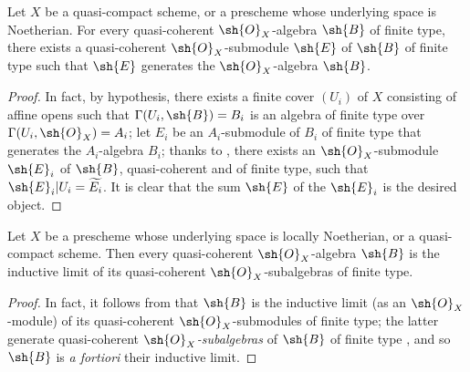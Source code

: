 \begin{proposition}[9.6.5]
\label{I.9.6.5}
Let $X$ be a quasi-compact scheme, or a prescheme whose underlying space is Noetherian.
For every quasi-coherent $\sh{O}_X$-algebra $\sh{B}$ of finite type, there exists a quasi-coherent $\sh{O}_X$-submodule $\sh{E}$ of $\sh{B}$ of finite type such that $\sh{E}$ generates  the $\sh{O}_X$-algebra $\sh{B}$.
\end{proposition}

\begin{proof}
In fact, by hypothesis, there exists a finite cover $(U_i)$ of $X$ consisting of affine opens such that $\Gamma(U_i,\sh{B})=B_i$ is an algebra of finite type over $\Gamma(U_i,\sh{O}_X)=A_i$; let $E_i$ be an $A_i$-submodule of $B_i$ of finite type that generates the $A_i$-algebra $B_i$; thanks to , there exists an $\sh{O}_X$-submodule $\sh{E}_i$ of $\sh{B}$, quasi-coherent and of finite type, such that $\sh{E}_i|U_i=\widetilde{E_i}$.
It is clear that the sum $\sh{E}$ of the $\sh{E}_i$ is the desired object.
\end{proof}

\begin{proposition}[9.6.6]
\label{I.9.6.6}
Let $X$ be a prescheme whose underlying space is locally Noetherian, or a quasi-compact scheme.
Then every quasi-coherent $\sh{O}_X$-algebra $\sh{B}$ is the inductive limit of its quasi-coherent $\sh{O}_X$-subalgebras of finite type.
\end{proposition}

\begin{proof}
In fact, it follows from  that $\sh{B}$ is the inductive limit (as an $\sh{O}_X$-module) of its quasi-coherent $\sh{O}_X$-submodules of finite type; the latter generate quasi-coherent \emph{$\sh{O}_X$-subalgebras} of $\sh{B}$ of finite type , and so $\sh{B}$ is \emph{a fortiori} their inductive limit.
\end{proof}
